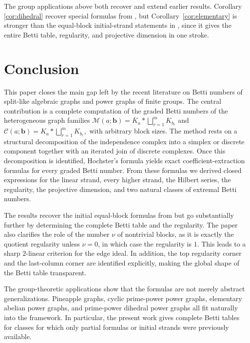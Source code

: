 \documentclass[12pt]{article}
\theoremstyle{definition}
\theoremstyle{remark}
\newcommand{\MM}{\mathcal{M}}
\newcommand{\CC}{\mathcal{C}}
\newcommand{\bk}[1]{\mathbf{#1}}
\begin{document}
	 The group applications above both recover and extend earlier results. Corollary \ref{cor:dihedral} recover special formulas from \cite{Rather2024,RatherWang2026}, but Corollary~\ref{cor:elementary} is stronger than the equal-block initial-strand statements in \cite{Rather2024}, since it gives the entire Betti table, regularity, and projective dimension in one stroke.
	
	
	
	\section{Conclusion}\label{sec:conclusion}
	
	This paper closes the main gap left by the recent literature on Betti numbers of split-like algebraic graphs and power graphs of finite groups. The central contribution is a complete computation of the graded Betti numbers of the heterogeneous graph families
	$ \MM(a;\bk{b})=\overline{K}_a * \bigsqcup_{r=1}^m K_{b_r} $ and $\CC(a;\bk{b})=K_a * \bigsqcup_{r=1}^m K_{b_r}, $ with arbitrary block sizes. The method rests on a structural decomposition of the independence complex into a simplex or discrete component together with an iterated join of discrete complexes. Once this decomposition is identified, Hochster's formula yields exact coefficient-extraction formulas for every graded Betti number. From these formulas we derived closed expressions for the linear strand, every higher strand, the Hilbert series, the regularity, the projective dimension, and two natural classes of extremal Betti numbers.
	
	The results recover the initial equal-block formulas from \cite{Rather2024} but go substantially further by determining the complete Betti table and the regularity. The paper also clarifies the role of the number $\nu$ of nontrivial blocks, as it is exactly the quotient regularity unless $\nu=0$, in which case the regularity is $1$. This leads to a sharp $2$-linear criterion for the edge ideal. In addition, the top regularity corner and the last-column corner are identified explicitly, making the global shape of the Betti table transparent.
	
	The group-theoretic applications show that the formulas are not merely abstract generalizations. Pineapple graphs, cyclic prime-power power graphs, elementary abelian power graphs, and prime-power dihedral power graphs all fit naturally into the framework. In particular, the present work gives complete Betti tables for classes for which only partial formulas or initial strands were previously available.
	
\end{document}
